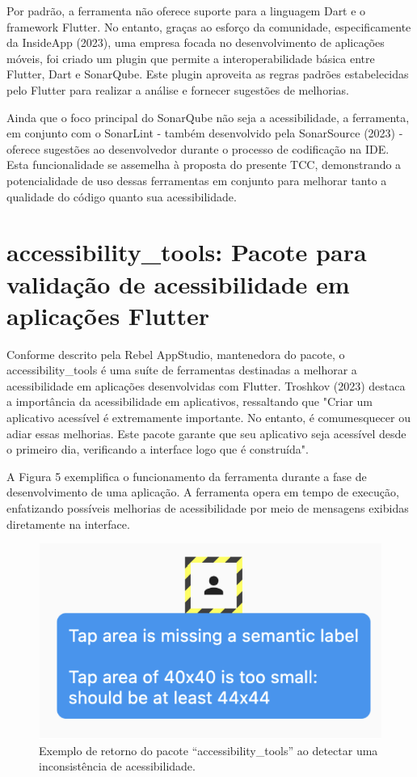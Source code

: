 Por padrão, a ferramenta não oferece suporte para a linguagem Dart e o framework Flutter. No entanto, graças ao esforço da comunidade, especificamente da InsideApp (2023), uma empresa focada no desenvolvimento de aplicações móveis, foi criado um plugin que permite a interoperabilidade básica entre Flutter, Dart e SonarQube. Este plugin aproveita as regras padrões estabelecidas pelo Flutter para realizar a análise e fornecer sugestões de melhorias.

Ainda que o foco principal do SonarQube não seja a acessibilidade, a ferramenta, em conjunto com o SonarLint - também desenvolvido pela SonarSource (2023) - oferece sugestões ao desenvolvedor durante o processo de codificação na IDE. Esta funcionalidade se assemelha à proposta do presente TCC, demonstrando a potencialidade de uso dessas ferramentas em conjunto para melhorar tanto a qualidade do código quanto sua acessibilidade.

\section{accessibility\_tools: Pacote para validação de acessibilidade em aplicações Flutter}

Conforme descrito pela Rebel AppStudio, mantenedora do pacote, o accessibility\_tools é uma suíte de ferramentas destinadas a melhorar a acessibilidade em aplicações desenvolvidas com Flutter. Troshkov (2023) destaca a importância da acessibilidade em aplicativos, ressaltando que "Criar um aplicativo acessível é extremamente importante. No entanto, é comumesquecer ou adiar essas melhorias. Este pacote garante que seu aplicativo seja acessível desde o primeiro dia, verificando a interface logo que é construída".

A Figura 5 exemplifica o funcionamento da ferramenta durante a fase de desenvolvimento de uma aplicação. A ferramenta opera em tempo de execução, enfatizando possíveis melhorias de acessibilidade por meio de mensagens exibidas diretamente na interface.

\begin{figure}[!h]
	\centering
	\caption{Exemplo de retorno do pacote “accessibility\_tools” ao detectar uma inconsistência de acessibilidade.}
	\includegraphics[width=384pt]{Assets/AccessibilityTools.png}
\end{figure}

